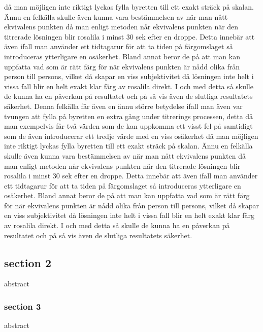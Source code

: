 då man möjligen inte riktigt lyckas fylla byretten till ett exakt sträck på skalan.
Ännu en felkälla skulle även kunna vara bestämmelsen av när man nått ekvivalens punkten då man
enligt metoden når ekvivalens punkten när den titrerade lösningen blir rosalila i minst 30 sek efter en
droppe. Detta innebär att även ifall man använder ett tidtagarur för att ta tiden på färgomslaget så
introduceras ytterligare en osäkerhet. Bland annat beror de på att man kan uppfatta vad som är rätt
färg för när ekvivalens punkten är nådd olika från person till persons, vilket då skapar en viss
subjektivitet då lösningen inte helt i vissa fall blir en helt exakt klar färg av rosalila direkt. I och med
detta så skulle de kunna ha en påverkan på resultatet och på så vis även de slutliga
resultatets säkerhet. Denna felkälla får även en ännu större betydelse ifall man även var tvungen att fylla på
byretten en extra gång under titrerings processen, detta då man exempelvis får två värden som de kan
uppkomma ett visst fel på samtidigt som de även introducerar ett tredje värde med en viss osäkerhet
då man möjligen inte riktigt lyckas fylla byretten till ett exakt sträck på skalan.
Ännu en felkälla skulle även kunna vara bestämmelsen av när man nått ekvivalens punkten då man
enligt metoden når ekvivalens punkten när den titrerade lösningen blir rosalila i minst 30 sek efter en
droppe. Detta innebär att även ifall man använder ett tidtagarur för att ta tiden på färgomslaget så
introduceras ytterligare en osäkerhet. Bland annat beror de på att man kan uppfatta vad som är rätt
färg för när ekvivalens punkten är nådd olika från person till persons, vilket då skapar en viss
subjektivitet då lösningen inte helt i vissa fall blir en helt exakt klar färg av rosalila direkt. I och med
detta så skulle de kunna ha en påverkan på resultatet och på så vis även de slutliga
resultatets säkerhet. 

\subsection{section 2}
abstract
\subsubsection{section 3}
abstract